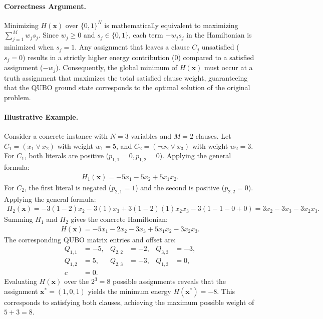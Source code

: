 \documentclass[12pt]{article}
\begin{document}
\paragraph{Correctness Argument.}
Minimizing $H(\mathbf{x})$ over $\{0,1\}^N$ is mathematically equivalent to maximizing $\sum_{j=1}^M w_j s_j$. Since $w_j \geq 0$ and $s_j \in \{0,1\}$, each term $-w_j s_j$ in the Hamiltonian is minimized when $s_j = 1$. Any assignment that leaves a clause $C_j$ unsatisfied ($s_j = 0$) results in a strictly higher energy contribution ($0$) compared to a satisfied assignment ($-w_j$). Consequently, the global minimum of $H(\mathbf{x})$ must occur at a truth assignment that maximizes the total satisfied clause weight, guaranteeing that the QUBO ground state corresponds to the optimal solution of the original problem.

\paragraph{Illustrative Example.}
Consider a concrete instance with $N=3$ variables and $M=2$ clauses. Let $C_1 = (x_1 \lor x_2)$ with weight $w_1 = 5$, and $C_2 = (\neg x_2 \lor x_3)$ with weight $w_2 = 3$. 
For $C_1$, both literals are positive ($p_{1,1}=0, p_{1,2}=0$). Applying the general formula:
\begin{align}
    H_1(\mathbf{x}) = -5x_1 - 5x_2 + 5x_1x_2.
\end{align}
For $C_2$, the first literal is negated ($p_{2,1}=1$) and the second is positive ($p_{2,2}=0$). Applying the general formula:
\begin{align}
    H_2(\mathbf{x}) = -3(1-2)x_2 - 3(1)x_3 + 3(1-2)(1)x_2x_3 - 3(1 - 1 - 0 + 0) = 3x_2 - 3x_3 - 3x_2x_3.
\end{align}
Summing $H_1$ and $H_2$ gives the concrete Hamiltonian:
\begin{align}
    H(\mathbf{x}) = -5x_1 - 2x_2 - 3x_3 + 5x_1x_2 - 3x_2x_3.
\end{align}
The corresponding QUBO matrix entries and offset are:
\begin{align}
    Q_{1,1} &= -5, & Q_{2,2} &= -2, & Q_{3,3} &= -3, \\
    Q_{1,2} &= 5, & Q_{2,3} &= -3, & Q_{1,3} &= 0, \\
    c &= 0.
\end{align}
Evaluating $H(\mathbf{x})$ over the $2^3=8$ possible assignments reveals that the assignment $\mathbf{x}^* = (1, 0, 1)$ yields the minimum energy $H(\mathbf{x}^*) = -8$. This corresponds to satisfying both clauses, achieving the maximum possible weight of $5 + 3 = 8$.
\end{document}
